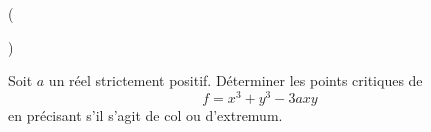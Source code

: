 \begin{tiny}()\end{tiny}
Soit $a$ un réel strictement positif. Déterminer les points critiques de
\begin{displaymath}
 f=x^3+y^3-3axy
\end{displaymath}
en précisant s'il s'agit de col ou d'extremum.